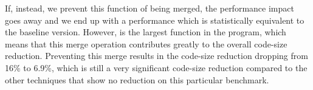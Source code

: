 
If, instead, we prevent this function of being merged, the performance
impact goes away and we end up with a performance which is statistically
equivalent to the baseline version.
However,  is the largest function in the program,
which means that this merge operation contributes
greatly to the overall code-size reduction.
Preventing this merge results in the code-size reduction dropping from 16\% to
6.9\%, which is still a very significant code-size reduction compared to the
other techniques that show no reduction on this particular benchmark.
